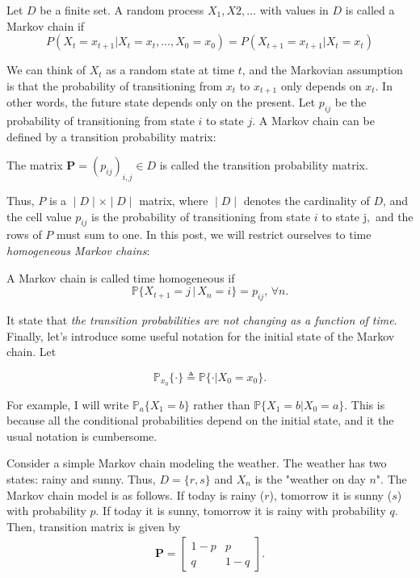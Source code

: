 \begin{definition}
	Let $D$ be a finite set. A random process $X_1, X2,\dots$  with values in $D$ is called a Markov chain if
$$P(X_t=x_{t+1}|X_{t}=x_t,\dots,X_0=x_0)=P(X_{t+1}=x_{t+1}|X_{t}=x_t)$$
\label{def:markov_chain}
\end{definition}
We can think of $X_t$ as a random state at time $t$, and the Markovian assumption is that the probability of transitioning from $x_t$ to $x_{t+1}$ only depends on $x_t$. In other words, the future state depends only on the present. Let $p_{ij}$ be the probability of transitioning from state $i$ to state $j$. A Markov chain can be defined by a transition probability matrix:
\begin{definition}
	The matrix $\mathbf{P}=(p_{ij})_{i,j}\in D$ is called the transition probability matrix.
\label{def:markov_chain_transition_matrix}
\end{definition}
Thus, $P$ is a $∣D∣\times∣D∣$ matrix, where $∣D∣$ denotes the cardinality of $D$, and the cell value $p_{ij}$ is the probability of transitioning from state $i$ to state j$,$ and the rows of $P$ must sum to one. In this post, we will restrict ourselves to time \textit{homogeneous Markov chains}:

\begin{definition}
A Markov chain is called time homogeneous if 
$$\mathbb{P}\{X_{t+1}=j\, |\, X_n=i\}=p_{ij},\, \forall n.$$
\end{definition}
It state that \textit{the transition probabilities are not changing as a function of time}. Finally, let's introduce some useful notation for the initial state of the Markov chain. Let

$$\mathbb{P}_{x_0}\{\cdot\}\triangleq \mathbb{P}\{\cdot | X_0=x_0\}.$$

For example, I will write $\mathbb{P}_a\{X_1=b\}$ rather than $\mathbb{P}\{X_1=b|X_0=a\}$. This is because all the conditional probabilities depend on the initial state, and it the usual notation is cumbersome.

Consider a simple Markov chain modeling the weather. The weather has two states: rainy and sunny. Thus, $D = \{r, s\}$ and $X_n$ is the "weather on day $n$". The Markov chain model is as follows. If today is rainy ($r$), tomorrow it is sunny ($s$) with probability $p$. If today it is sunny, tomorrow it is rainy with probability $q$. Then, transition matrix is given by 
\begin{align*}
	\mathbf{P} = 
	\begin{bmatrix}
		1-p & p\\
		q & 1-q
	\end{bmatrix}.
\end{align*}

